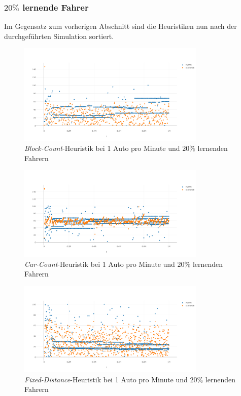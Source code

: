 \subsubsection*{$20\%$ lernende Fahrer}
Im Gegensatz zum vorherigen Abschnitt sind die Heuristiken nun nach der durchgeführten Simulation sortiert.
\begin{figure}[H]
	\includegraphics[width=0.8\textwidth]{analyse/SomeMutants/1pm/block1some.png}
	\caption{\emph{Block-Count}-Heuristik bei 1 Auto pro Minute und $20\%$ lernenden Fahrern}\label{fig:ap_pm_bs_1}
\end{figure}
\begin{figure}[H]
	\includegraphics[width=0.8\textwidth]{analyse/SomeMutants/1pm/car1some.png}
	\caption{\emph{Car-Count}-Heuristik bei 1 Auto pro Minute und $20\%$ lernenden Fahrern}\label{fig:ap_pm_cc_1}
\end{figure}
\begin{figure}[H]
	\includegraphics[width=0.8\textwidth]{analyse/SomeMutants/1pm/fixed1some.png}
	\caption{\emph{Fixed-Distance}-Heuristik bei 1 Auto pro Minute und $20\%$ lernenden Fahrern}\label{fig:ap_pm_fd_1}
\end{figure}
